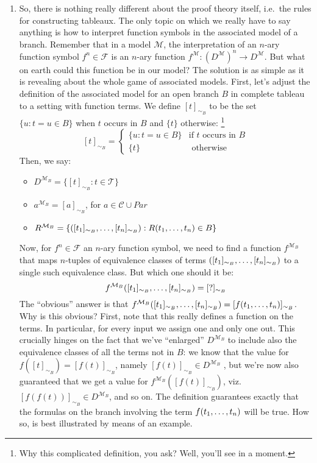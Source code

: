 \begin{enumerate}[\thesection.1]
	  \item So, there is nothing really different about the proof theory itself,
		i.e.\ the rules for constructing tableaux.
		The only topic on which we really have to say anything is how to interpret function symbols in the associated model of a branch.
		Remember that in a model $\mathcal{M}$, the interpretation of an $n$-ary function symbol $f^n\in\mathcal{F}$ is an $n$-ary function
		$f^\mathcal{M}:(D^\mathcal{M})^n\to D^\mathcal{M}$.
		But what on earth could this function be in our model?
		The solution is as simple as it is revealing about the whole game of associated models.
		First, let's adjust the definition of the associated model for an open branch $B$ in complete tableau to a setting with function terms.
		We define $[t]_{\sim_B}$ to be the set $\{u:t=u\in B\}$ when $t$ occurs in $B$ and $\{t\}$ otherwise:
		\footnote{%
		Why this complicated definition, you ask?
		Well, you'll see in a moment.}
		\[[t]_{\sim_B}=\begin{cases}
			\{u:t=u\in B\} &\text{if }t\text{ occurs in }B\\
			\{t\} &\text{ otherwise}\end{cases}
		\]
	Then, we say:
		\begin{itemize}
		
			\item $D^{\mathcal{M}_B}=\{[t]_{\sim_B}:t\in\mathcal{T}\}$
			
			\item $a^{\mathcal{M}_B}=[a]_{\sim_B}$, for $a\in \mathcal{C}\cup Par$
			
			\item $R^{\mathcal{M}_B}=\{([t_1]_{\sim_B}, \mathellipsis, [t_n]_{\sim_B}): R(t_1, \mathellipsis, t_n)\in B\}$

		\end{itemize}
		Now, for $f^n\in\mathcal{F}$ an $n$-ary function symbol, we need to find a function $f^{\mathcal{M}_B}$ that maps $n$-tuples of equivalence classes of terms
		$([t_1]_{\sim_B},\mathellipsis, [t_n]_{\sim_B})$
		to a single such equivalence class.
		But which one should it be:
		\[f^{\mathcal{M}_B}([t_1]_{\sim_B},\mathellipsis, [t_n]_{\sim_B})=[?]_{\sim_B}\]
		The ``obvious'' answer is that $f^{\mathcal{M}_B}([t_1]_{\sim_B},\mathellipsis, [t_n]_{\sim_B})=[f(t_1, \mathellipsis, t_n)]_{\sim_B}$.
		Why is this obvious?
		First, note that this really defines a function on the terms.
		In particular, for every input we assign one and only one out.
		This crucially hinges on the fact that we've ``enlarged'' $D^{\mathcal{M}_B}$ to include also the equivalence classes of all the terms not in $B$:
		we know that the value for
		$f([t]_{\sim_B})=[f(t)]_{\sim_B}$,
		namely $[f(t)]_{\sim_B}\in D^{\mathcal{M}_B}$ ,
		but we're now also guaranteed that we get a value for $f^{\mathcal{M}_B}([f(t)]_{\sim_B})$, viz. $[f(f(t))]_{\sim_B}\in D^{\mathcal{M}_B}$, and so on.
		The definition guarantees exactly that the formulas on the branch involving the term $f(t_1, \mathellipsis, t_n)$ will be true.
		How so, is best illustrated by means of an example.


\end{enumerate}
